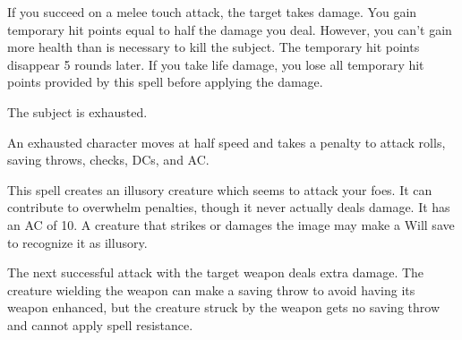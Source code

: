 \begin{spelleffect}
If you succeed on a melee touch attack, the target takes damage. You gain temporary hit points equal to half the damage you deal. However, you can't gain more health than is necessary to kill the subject. The temporary hit points disappear 5 rounds later. If you take life damage, you lose all temporary hit points provided by this spell before applying the damage.
\end{spelleffect}

\spellrng{\rngmed}
\begin{spelleffect}
The subject is exhausted.
\end{spelleffect}
\begin{spellnotes}
 An exhausted character moves at half speed and takes a  penalty to attack rolls, saving throws, checks, DCs, and AC.
\end{spellnotes}

\spellrng{\rngmed}
\begin{spelleffect}
This spell creates an illusory creature which seems to attack your foes. It can contribute to overwhelm penalties, though it never actually deals damage. It has an AC of 10. A creature that strikes or damages the image may make a Will save to recognize it as illusory.
\end{spelleffect}

\spellrng{\rngclose}
\begin{spelleffect}
The next successful attack with the target weapon deals extra damage. The creature wielding the weapon can make a saving throw to avoid having its weapon enhanced, but the creature struck by the weapon gets no saving throw and cannot apply spell resistance.
\end{spelleffect}

